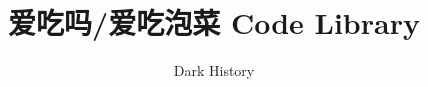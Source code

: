 \documentclass[twoside,a4paper]{article}
\begin{document}
\title{\Huge \bf 爱吃吗/爱吃泡菜 Code Library}
\author{Dark History}
\date{}

\maketitle

\begin{multicols*}{3}
\tableofcontents
\end{multicols*}

\newpage

\columnseprule=0pt

\begin{multicols*}{2}

\end{multicols*}
\end{document}
